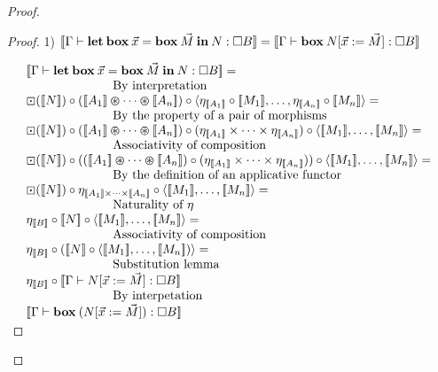 \documentclass[a4paper]{article}
\begin{document}
\begin{proof}
\begin{proof}
1) $[\![\Gamma \vdash {\bf let \: box \:} \vec{x} = {\bf box \:} \vec{M} {\: \bf in \:} N : \Box B]\!] = [\![\Gamma \vdash {\bf box \:} N [\vec{x} := \vec{M}] : \Box B]\!]$

\vspace{\baselineskip}

$\begin{array}{lll}
&[\![\Gamma \vdash {\bf let \: box \:} \vec{x} = {\bf box \:} \vec{M} {\: \bf in \:} N : \Box B]\!] = & \\
&\quad\quad\quad\quad\quad\quad\quad \text{By interpretation}& \\
&\boxdot ([\![N]\!]) \circ ([\![A_1]\!] \varoast \dots \varoast [\![A_n]\!]) \circ \langle \eta_{[\![A_1]\!]} \circ [\![M_1]\!],\dots,\eta_{[\![A_n]\!]} \circ [\![M_n]\!] \rangle = \\
&\quad\quad\quad\quad\quad\quad\quad \text{By the property of a pair of morphisms}& \\
&\boxdot ([\![N]\!]) \circ ([\![A_1]\!] \varoast \dots \varoast [\![A_n]\!]) \circ (\eta_{[\![A_1]\!]} \times \dots \times \eta_{[\![A_n]\!]}) \circ \langle [\![M_1]\!], \dots, [\![M_n]\!]\rangle =& \\
&\quad\quad\quad\quad\quad\quad\quad \text{Associativity of composition}& \\
&\boxdot ([\![N]\!]) \circ (([\![A_1]\!] \varoast \dots \varoast [\![A_n]\!]) \circ (\eta_{[\![A_1]\!]} \times \dots \times \eta_{[\![A_n]\!]})) \circ \langle [\![M_1]\!], \dots, [\![M_n]\!] \rangle =& \\
&\quad\quad\quad\quad\quad\quad\quad \text{By the definition of an applicative functor}& \\
&\boxdot ([\![N]\!]) \circ \eta_{[\![A_1]\!] \times \dots \times [\![A_n]\!]} \circ \langle [\![M_1]\!], \dots, [\![M_n]\!] \rangle =& \\
&\quad\quad\quad\quad\quad\quad\quad \text{Naturality of $\eta$}& \\
&\eta_{[\![B]\!]} \circ [\![N]\!] \circ \langle [\![M_1]\!], \dots, [\![M_n]\!] \rangle =& \\
&\quad\quad\quad\quad\quad\quad\quad \text{Associativity of composition}& \\
&\eta_{[\![B]\!]} \circ ([\![N]\!] \circ \langle [\![M_1]\!], \dots, [\![M_n]\!]) \rangle =& \\
&\quad\quad\quad\quad\quad\quad\quad \text{Substitution lemma}& \\
&\eta_{[\![B]\!]} \circ [\![\Gamma \vdash N [\vec{x} := \vec{M}] : \Box B]\!]& \\
&\quad\quad\quad\quad\quad\quad\quad \text{By interpetation}& \\
&[\![\Gamma \vdash {\bf box \:} (N [\vec{x} := \vec{M}]) : \Box B]\!]&
\end{array}$


\end{proof}
\end{proof}
\end{document}
